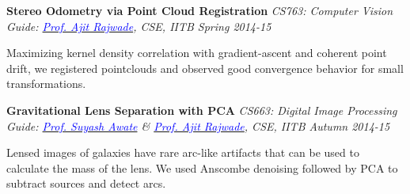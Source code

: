 \documentclass[margin,line]{res}
\newenvironment{list1}{
  \begin{list}{\ding{113}}{%
      \setlength{\itemsep}{0in}
      \setlength{\parsep}{0in} \setlength{\parskip}{0in}
      \setlength{\topsep}{0in} \setlength{\partopsep}{0in} 
      \setlength{\leftmargin}{0.17in}}}{\end{list}}
\begin{document}
\begin{resume}
\vspace*{-0.13in}

{\bf Stereo Odometry via Point Cloud Registration} \hfill \textit{CS763: Computer Vision} \\
{\em Guide: \href{https://www.cse.iitb.ac.in/~ajitvr}{\textcolor{blue}{Prof. Ajit Rajwade}}, CSE, IITB \hfill Spring 2014-15} \\
\vspace*{-.15in}
\begin{list1}
\item[] Maximizing kernel density correlation with gradient-ascent and coherent point drift, we registered pointclouds and observed good convergence behavior for small transformations.
\end{list1}

\vspace*{-0.13in}

{\bf Gravitational Lens Separation with PCA} \hfill \textit{CS663: Digital Image Processing} \\
{\em Guide: \href{https://www.cse.iitb.ac.in/~suyash}{\textcolor{blue}{Prof. Suyash Awate}} \& \href{https://www.cse.iitb.ac.in/~ajitvr}{\textcolor{blue}{Prof. Ajit Rajwade}}, CSE, IITB \hfill Autumn 2014-15} \\
\vspace*{-.15in}
\begin{list1}
\item[] Lensed images of galaxies have rare arc-like artifacts that can be used to calculate the mass of the lens. We used Anscombe denoising followed by PCA to subtract sources and detect arcs.
\end{list1}

\vspace*{-0.13in}

%


\end{resume}
\end{document}
